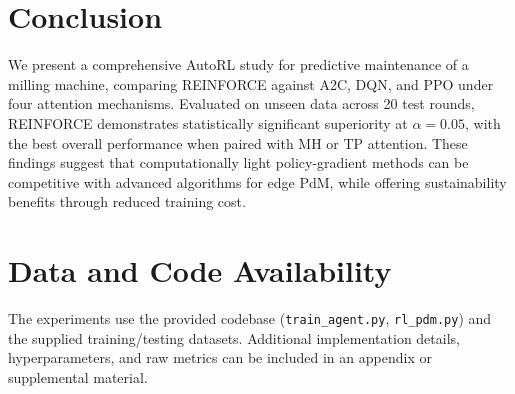 \documentclass[11pt]{article}
\begin{document}
\section{Conclusion}
We present a comprehensive AutoRL study for predictive maintenance of a milling machine, comparing REINFORCE against A2C, DQN, and PPO under four attention mechanisms. Evaluated on unseen data across 20 test rounds, REINFORCE demonstrates statistically significant superiority at $\alpha=0.05$, with the best overall performance when paired with MH or TP attention. These findings suggest that computationally light policy-gradient methods can be competitive with advanced algorithms for edge PdM, while offering sustainability benefits through reduced training cost.

\section*{Data and Code Availability}
The experiments use the provided codebase (\texttt{train\_agent.py}, \texttt{rl\_pdm.py}) and the supplied training/testing datasets. Additional implementation details, hyperparameters, and raw metrics can be included in an appendix or supplemental material.
\end{document}
